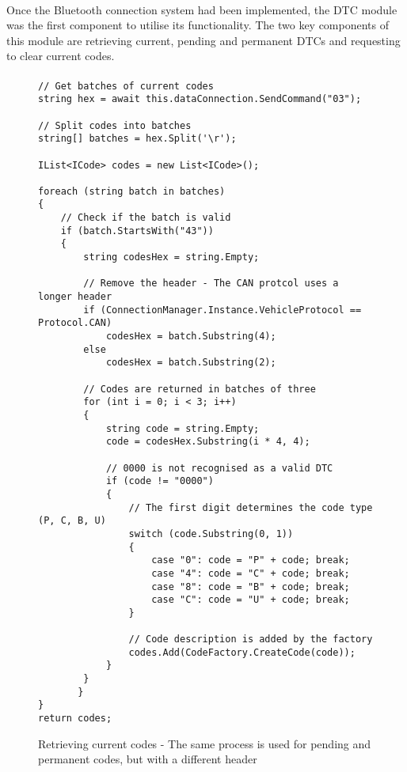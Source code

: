 	\paragraph{}{
	Once the Bluetooth connection system had been implemented, the DTC module was the first component to utilise its functionality. The two key components of this module are retrieving current, pending and permanent DTCs and requesting to clear current codes.
	}
	\paragraph{}{
	}
	
	\begin{figure}[h]
		\begin{lstlisting}
// Get batches of current codes
string hex = await this.dataConnection.SendCommand("03");

// Split codes into batches
string[] batches = hex.Split('\r');

IList<ICode> codes = new List<ICode>();

foreach (string batch in batches)
{
	// Check if the batch is valid
    if (batch.StartsWith("43"))
    {        
        string codesHex = string.Empty;
        		
		// Remove the header - The CAN protcol uses a longer header
		if (ConnectionManager.Instance.VehicleProtocol == Protocol.CAN)
			codesHex = batch.Substring(4);
        else
			codesHex = batch.Substring(2);

        // Codes are returned in batches of three
		for (int i = 0; i < 3; i++)
		{
			string code = string.Empty;
			code = codesHex.Substring(i * 4, 4);

			// 0000 is not recognised as a valid DTC
			if (code != "0000")
			{
				// The first digit determines the code type (P, C, B, U)
				switch (code.Substring(0, 1))
				{
					case "0": code = "P" + code; break;
					case "4": code = "C" + code; break;
					case "8": code = "B" + code; break;
					case "C": code = "U" + code; break;						
				}					
				
				// Code description is added by the factory
				codes.Add(CodeFactory.CreateCode(code));
			}
		}
       }
}
return codes;
		\end{lstlisting}
		\caption{Retrieving current codes - The same process is used for pending and permanent codes, but with a different header}
		\label{code:DTCModuleCodes}
	\end{figure}
			
